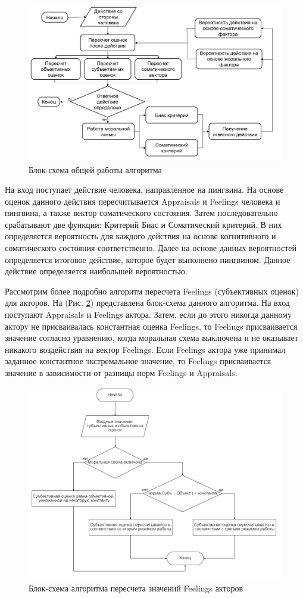 \begin{figure}[h]
\includegraphics[width=0.75\columnwidth]{./img/oldcmodel0.png}
\centering
\caption{Блок-схема общей работы алгоритма}
\label{pic:oldcmodel0}
\end{figure}

На вход поступает действие человека, направленное на пингвина. На основе оценок данного действия пересчитывается Appraisals и Feelings человека и пингвина, а также 
вектор соматического состояния. Затем последовательно срабатывают две функции: Критерий Биас и Соматический критерий. 
В них определяется вероятность для каждого действия на основе когнитивного и соматического состояния соответственно.
Далее на основе данных вероятностей определяется итоговое действие, которое будет выполнено пингвином. 
Данное действие определяется наибольшей вероятностью. 

Рассмотрим более подробно алгоритм пересчета Feelings (субъективных оценок) для акторов. На (Рис. \ref{pic:oldcmodel1}) представлена блок-схема данного алгоритма. На вход поступают Appraisals и Feelings актора. 
Затем, если до этого никогда данному актору не присваивалась константная оценка Feelings, то Feelings присваивается значение согласно уравнению, 
когда моральная схема выключена и не оказывает никакого воздействия на вектор Feelings. 
Если Feelings актора уже принимал заданное константное экстремальное значение, то Feelings присваивается значение в зависимости от разницы норм Feelings и Appraisals.

\begin{figure}[h]
\includegraphics[width=0.75\columnwidth]{./img/oldcmodel1.png}
\centering
\caption{Блок-схема алгоритма пересчета значений Feelings акторов}
\label{pic:oldcmodel1}
\end{figure}

